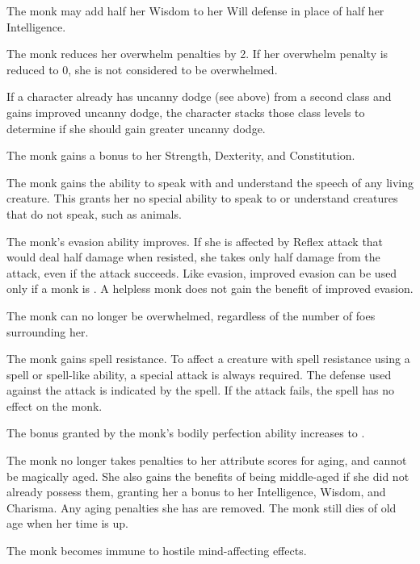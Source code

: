  The monk may add half her Wisdom to her Will defense in place of half her Intelligence.

  The monk reduces her overwhelm penalties by 2. If her overwhelm penalty is reduced to 0, she is not considered to be overwhelmed.
\par If a character already has uncanny dodge (see above) from a second class and gains improved uncanny dodge, the character stacks those class levels to determine if she should gain greater uncanny dodge.

 The monk gains a  bonus to her Strength, Dexterity, and Constitution.

 The monk gains the ability to speak with and understand the speech of any living creature. This grants her no special ability to speak to or understand creatures that do not speak, such as animals.

 The monk's evasion ability improves. If she is affected by Reflex attack that would deal half damage when resisted, she takes only half damage from the attack, even if the attack succeeds. Like evasion, improved evasion can be used only if a monk is \unencumbered. A helpless monk does not gain the benefit of improved evasion.

 The monk can no longer be overwhelmed, regardless of the number of foes surrounding her.

 The monk gains spell resistance. To affect a creature with spell resistance using a spell or spell-like ability, a special attack is always required. The defense used against the attack is indicated by the spell. If the attack fails, the spell has no effect on the monk.

 The bonus granted by the monk's bodily perfection ability increases to .

 The monk no longer takes penalties to her attribute scores for aging, and cannot be magically aged. She also gains the benefits of being middle-aged if she did not already possess them, granting her a  bonus to her Intelligence, Wisdom, and Charisma. Any aging penalties she has are removed. The monk still dies of old age when her time is up.

 The monk becomes immune to hostile mind-affecting effects.

